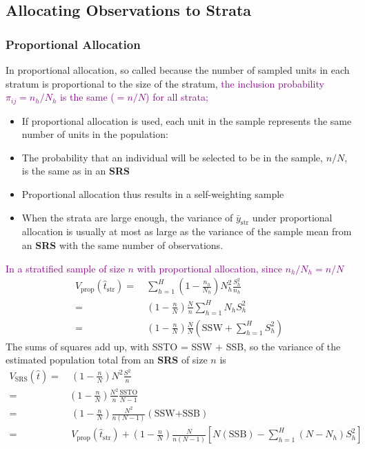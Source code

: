 \documentclass[a4paper,twoside,11pt]{article}
\begin{document}
\subsection{Allocating Observations to Strata}
\subsubsection{Proportional Allocation}
In proportional allocation, so called because the number of sampled units in each stratum is proportional to the size of the stratum, \textcolor{Purple}{the inclusion probability $\pi_{ij}=n_h/N_h$ is the same ($=n/N$) for all strata;}
\begin{itemize}
    \item If proportional allocation is used, each unit in the sample represents the same number of units in the population:
    \item The probability that an individual will be selected to be in the sample, $n/N$, is the same as in an \textbf{SRS}
    \item Proportional allocation thus results in a self-weighting sample
    \item When the strata are large enough, the variance of $\bar{y}_{\text{str}}$ under proportional allocation is usually at most as large as the variance of the sample mean from an \textbf{SRS} with the same number of observations. 
\end{itemize}
\textcolor{Purple}{In a stratified sample of size $n$ with proportional allocation, since $n_h/N_h = n/N$}
\begin{equation*}
\begin{aligned}
V_{\text{prop}}(\hat{t}_{\text{str}}) =& \  \sum^H_{h=1} (1-\frac{n_h}{N_h}) N_h^2 \frac{S_h^2}{n_h} \\
=& \ (1-\frac{n}{N})\frac{N}{n} \sum^H_{h=1}N_h S_h^2 \\
=& \ (1-\frac{n}{N})\frac{N}{N}(\text{SSW} + \sum^H_{h=1} S_h^2)
\end{aligned}
\end{equation*}
The sums of squares add up, with SSTO = SSW + SSB, so the variance of the estimated population total from an \textbf{SRS} of size $n$ is
\begin{equation*}
\begin{aligned}
V_{\text{SRS}}(\hat{t}) =& \ (1-\frac{n}{N})N^2 \frac{S^2}{n}\\
=& (1-\frac{n}{N}) \frac{N^2}{n} \frac{\text{SSTO}}{N-1} \\
=& \ (1-\frac{n}{N}) \frac{N^2}{n(N-1)}  (\text{SSW+SSB}) \\
=& \ V_{\text{prop}} (\hat{t}_{\text{str}}) + (1-\frac{n}{N}) \frac{N}{n(N-1)} [N(\text{SSB}) - \sum^H_{h=1} (N-N_h) S_h^2]
\end{aligned}
\end{equation*}
\end{document}
